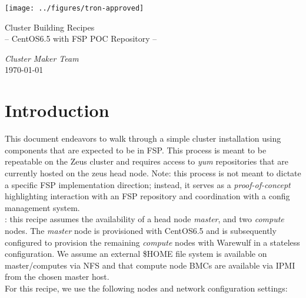 \documentclass[letterpaper]{article}
\begin{document}
{\hfill\texttt{[image: ../figures/tron-approved]}}


\begin{center}
\vspace*{-0.5cm}
{\Large Cluster Building Recipes} \\ \vspace*{0.2cm}
{\large -- CentOS6.5 with FSP POC Repository -- } \\ \vspace*{0.75cm}

{\large \em Cluster Maker Team} \\
\today
\end{center}


\section{Introduction}
This document endeavors to walk through a simple cluster installation using
components that are expected to be in FSP. This process is meant to be
repeatable on the Zeus cluster and requires access to {\em yum} repositories
that are currently hosted on the zeus head node. Note: this process is not
meant to dictate a specific FSP implementation direction; instead, it serves as a {\em
  proof-of-concept} highlighting interaction with an FSP repository and
coordination with a config management system. \\

: this recipe assumes the availability of a head node
	  {\em master}, and two {\em compute} nodes. The {\em master} node is
	  provisioned with CentOS6.5 and is subsequently configured to
	  provision the remaining {\em compute} nodes with Warewulf in a
	  stateless configuration. We assume an external \$HOME file system is
	  available on master/computes via NFS and that compute node BMCs are
	  available via IPMI from the chosen master host. \\

\noindent For this recipe, we use the following nodes and network configuration
settings:
\end{document}
